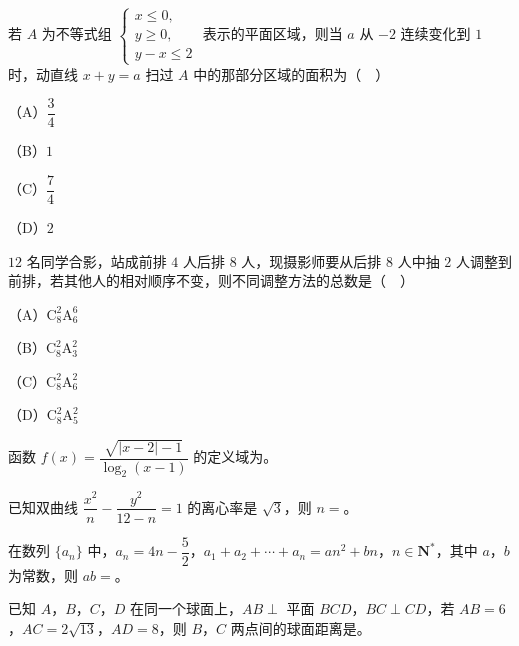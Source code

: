 \endgroup
\begin{question}
若 $A$ 为不等式组 $\begin{cases}x\leqslant0,\\ y\geqslant0,\\ y-x\leqslant2\end{cases}$ 表示的平面区域，则当 $a$ 从 $-2$ 连续变化到 $1$ 时，动直线 $x+y=a$ 扫过 $A$ 中的那部分区域的面积为（　）

（A）$\dfrac34$

（B）$1$

（C）$\dfrac74$

（D）$2$

\end{question}
\begin{question}
$12$ 名同学合影，站成前排 $4$ 人后排 $8$ 人，现摄影师要从后排 $8$ 人中抽 $2$ 人调整到前排，若其他人的相对顺序不变，则不同调整方法的总数是（　）

（A）$\mathrm C_8^2\mathrm A_6^6$

（B）$\mathrm C_8^2\mathrm A_3^2$

（C）$\mathrm C_8^2\mathrm A_6^2$

（D）$\mathrm C_8^2\mathrm A_5^2$

\end{question}

\begin{question}
函数 $f(x)=\dfrac{\sqrt{|x-2|-1}}{\log_2(x-1)}$ 的定义域为\gkblank{}。

\end{question}
\begin{question}
已知双曲线 $\dfrac{x^2}{n}-\dfrac{y^2}{12-n}=1$ 的离心率是 $\sqrt3$，则 $n=$\gkblank{}。

\end{question}
\begin{question}
在数列 $\{a_n\}$ 中，$a_n=4n-\dfrac52$，$a_1+a_2+\cdots+a_n=an^2+bn$，$n\in\mathbf N^*$，其中 $a$，$b$ 为常数，则 $ab=$\gkblank{}。

\end{question}
\begin{question}
已知 $A$，$B$，$C$，$D$ 在同一个球面上，$AB\perp$ 平面 $BCD$，$BC\perp CD$，若 $AB=6$，$AC=2\sqrt{13}$，$AD=8$，则 $B$，$C$ 两点间的球面距离是\gkblank{}。

\end{question}

